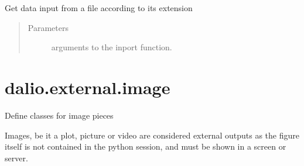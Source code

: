 \documentclass[letterpaper,10pt,english]{sphinxmanual}
\begin{document}
\begin{fulllineitems}
\begin{fulllineitems}
\label{\detokenize{dalio.external:dalio.external.file.PandasInFile.request}}
Get data input from a file according to its extension
\begin{quote}\begin{description}
\item[{Parameters}] \leavevmode
{} \textendash{} arguments to the inport function.

\end{description}\end{quote}

\end{fulllineitems}


\end{fulllineitems}



\section{dalio.external.image}
\label{\detokenize{dalio.external:module-dalio.external.image}}\label{\detokenize{dalio.external:dalio-external-image}}
Define classes for image pieces

Images, be it a plot, picture or video are considered external outputs as the
figure itself is not contained in the python session, and must be shown in a
screen or server.
\end{document}
